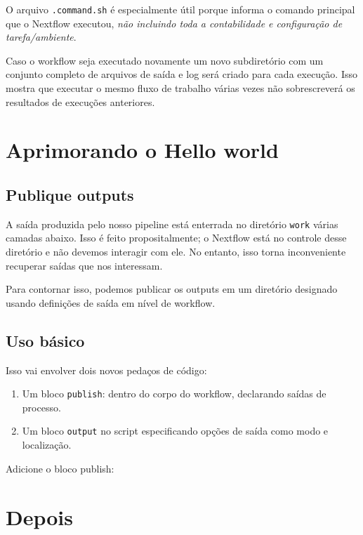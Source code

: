 \documentclass[
  brazilian,
  letterpaper,
  DIV=11,
  numbers=noendperiod]{scrreprt}
\providecommand{\tightlist}{%
  \setlength{\itemsep}{0pt}\setlength{\parskip}{0pt}}
\begin{document}
O arquivo \texttt{.command.sh} é especialmente útil porque informa o
comando principal que o Nextflow executou, \emph{não incluindo toda a
contabilidade e configuração de tarefa/ambiente}.

Caso o workflow seja executado novamente um novo subdiretório com um
conjunto completo de arquivos de saída e log será criado para cada
execução. Isso mostra que executar o mesmo fluxo de trabalho várias
vezes não sobrescreverá os resultados de execuções anteriores.

\section{Aprimorando o Hello world}\label{aprimorando-o-hello-world}

\subsection{Publique outputs}\label{publique-outputs}

A saída produzida pelo nosso pipeline está enterrada no diretório
\texttt{work} várias camadas abaixo. Isso é feito propositalmente; o
Nextflow está no controle desse diretório e não devemos interagir com
ele. No entanto, isso torna inconveniente recuperar saídas que nos
interessam.

Para contornar isso, podemos publicar os outputs em um diretório
designado usando definições de saída em nível de workflow.

\subsection{Uso básico}\label{uso-buxe1sico}

Isso vai envolver dois novos pedaços de código:

\begin{enumerate}
\def\labelenumi{\arabic{enumi}.}
\tightlist
\item
  Um bloco \texttt{publish}: dentro do corpo do workflow, declarando
  saídas de processo.
\item
  Um bloco \texttt{output} no script especificando opções de saída como
  modo e localização.
\end{enumerate}

Adicione o bloco publish:

\section{Depois}
\end{document}
